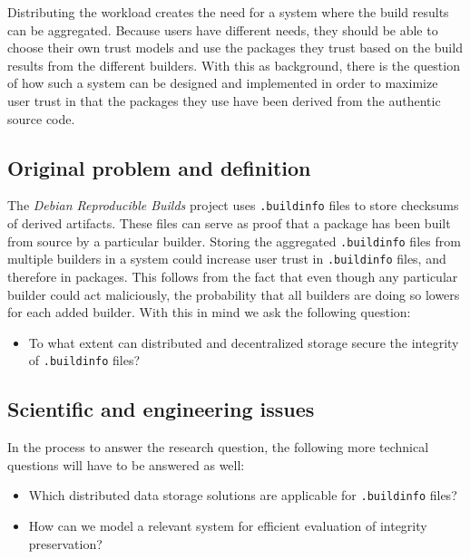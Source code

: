 \documentclass[english, biblatex, digitaloutput]{kththesis}
\begin{document}
Distributing the workload creates the need for a system where the build results can be aggregated. Because users have different needs, they should be able to choose their own trust models and use the packages they trust based on the build results from the different builders. With this as background, there is the question of how such a system can be designed and implemented in order to maximize user trust in that the packages they use have been derived from the authentic source code.

\subsection{Original problem and definition}
\label{sec:researchQuestion}

The \textit{Debian Reproducible Builds} project uses \texttt{.buildinfo} files to store checksums of derived artifacts. These files can serve as proof that a package has been built from source by a particular builder. Storing the aggregated \texttt{.buildinfo} files from multiple builders in a system could increase user trust in \texttt{.buildinfo} files, and therefore in packages. This follows from the fact that even though any particular builder could act maliciously, the probability that all builders are doing so lowers for each added builder. With this in mind we ask the following question:

\begin{itemize}
	\item To what extent can distributed and decentralized storage secure the integrity of \texttt{.buildinfo} files?
\end{itemize}

\subsection{Scientific and engineering issues}
\label{subsec:scientific-issues}

In the process to answer the research question, the following more technical questions will have to be answered as well:

\begin{itemize}
	\item Which distributed data storage solutions are applicable for \texttt{.buildinfo} files?
	\item How can we model a relevant system for efficient evaluation of integrity preservation?
\end{itemize}
\end{document}
